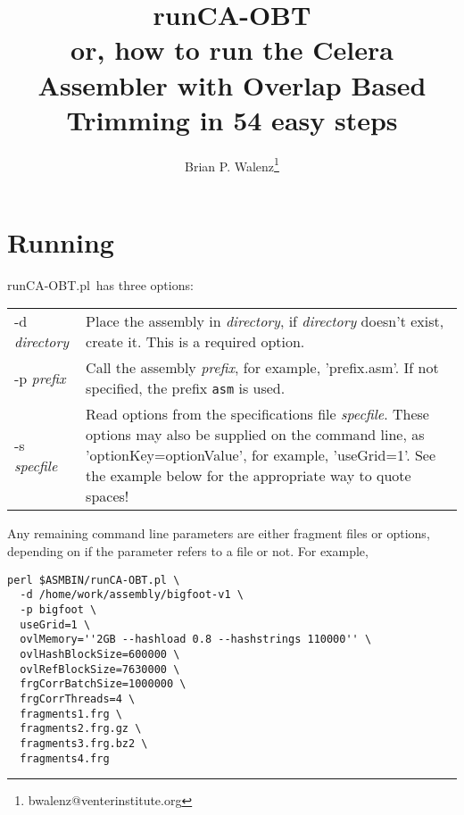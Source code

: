 \documentclass[twoside,11pt]{article}
\begin{document}
\pagestyle{fancy}

\rhead[]{}
\lhead[\today]{\today}

\newcommand{\runCA}{{\sc runCA-OBT.pl}}

\normalem

\title{runCA-OBT\\
{\small or, how to run the Celera Assembler with Overlap Based Trimming in 54 easy steps}}
\author{Brian P. Walenz\thanks{bwalenz@venterinstitute.org}}

\maketitle



\section{Running}

\runCA\ has three options:

\begin{longtable}{lp{3.0in}}
-d {\it directory} &
Place the assembly in {\it directory}, if {\it directory} doesn't exist,
create it.  This is a required option.
\\
-p {\it prefix} &
Call the assembly {\it prefix}, for example, 'prefix.asm'.  If not
specified, the prefix {\tt asm} is used.
\\
-s {\it specfile} &
Read options from the specifications file {\it specfile}.  These
options may also be supplied on the command line, as
'optionKey=optionValue', for example, 'useGrid=1'.  See the example
below for the appropriate way to quote spaces!
\end{longtable}

Any remaining command line parameters are either fragment files or
options, depending on if the parameter refers to a file or not.  For example,

\begin{verbatim}
perl $ASMBIN/runCA-OBT.pl \
  -d /home/work/assembly/bigfoot-v1 \
  -p bigfoot \
  useGrid=1 \
  ovlMemory=''2GB --hashload 0.8 --hashstrings 110000'' \
  ovlHashBlockSize=600000 \
  ovlRefBlockSize=7630000 \
  frgCorrBatchSize=1000000 \
  frgCorrThreads=4 \
  fragments1.frg \
  fragments2.frg.gz \
  fragments3.frg.bz2 \
  fragments4.frg
\end{verbatim}
\end{document}
